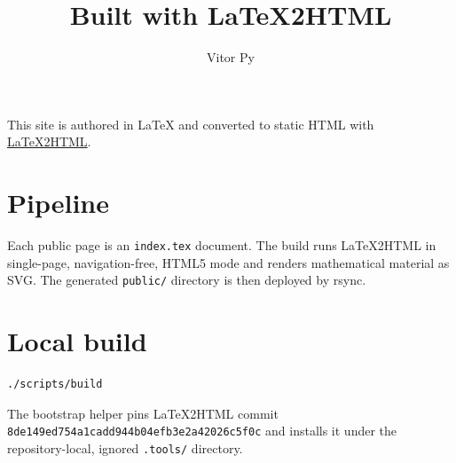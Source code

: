 \documentclass{article}
\title{Built with LaTeX2HTML}
\author{Vitor Py}
\date{}
\begin{document}

\maketitle

This site is authored in LaTeX and converted to static HTML with
\href{https://github.com/latex2html/latex2html}{LaTeX2HTML}.

\section{Pipeline}

Each public page is an \texttt{index.tex} document.  The build runs LaTeX2HTML
in single-page, navigation-free, HTML5 mode and renders mathematical material as SVG.
The generated \texttt{public/} directory is then deployed by rsync.

\section{Local build}

\begin{verbatim}
./scripts/build
\end{verbatim}

The bootstrap helper pins LaTeX2HTML commit
\texttt{8de149ed754a1cadd944b04efb3e2a42026c5f0c} and installs it under the
repository-local, ignored \texttt{.tools/} directory.


\end{document}
